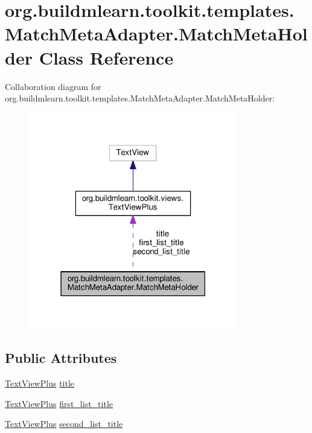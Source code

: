 \hypertarget{classorg_1_1buildmlearn_1_1toolkit_1_1templates_1_1MatchMetaAdapter_1_1MatchMetaHolder}{}\section{org.\+buildmlearn.\+toolkit.\+templates.\+Match\+Meta\+Adapter.\+Match\+Meta\+Holder Class Reference}
\label{classorg_1_1buildmlearn_1_1toolkit_1_1templates_1_1MatchMetaAdapter_1_1MatchMetaHolder}


Collaboration diagram for org.\+buildmlearn.\+toolkit.\+templates.\+Match\+Meta\+Adapter.\+Match\+Meta\+Holder\+:
\nopagebreak
\begin{figure}[H]
\begin{center}
\leavevmode
\includegraphics[width=259pt]{classorg_1_1buildmlearn_1_1toolkit_1_1templates_1_1MatchMetaAdapter_1_1MatchMetaHolder__coll__graph}
\end{center}
\end{figure}
\subsection*{Public Attributes}
\begin{DoxyCompactItemize}
\item 
\hyperlink{classorg_1_1buildmlearn_1_1toolkit_1_1views_1_1TextViewPlus}{Text\+View\+Plus} \hyperlink{classorg_1_1buildmlearn_1_1toolkit_1_1templates_1_1MatchMetaAdapter_1_1MatchMetaHolder_ac796e46f5bb18dd6f1dc765e56ae63f1}{title}
\item 
\hyperlink{classorg_1_1buildmlearn_1_1toolkit_1_1views_1_1TextViewPlus}{Text\+View\+Plus} \hyperlink{classorg_1_1buildmlearn_1_1toolkit_1_1templates_1_1MatchMetaAdapter_1_1MatchMetaHolder_af1bbb774b9afd21857071f608d267083}{first\+\_\+list\+\_\+title}
\item 
\hyperlink{classorg_1_1buildmlearn_1_1toolkit_1_1views_1_1TextViewPlus}{Text\+View\+Plus} \hyperlink{classorg_1_1buildmlearn_1_1toolkit_1_1templates_1_1MatchMetaAdapter_1_1MatchMetaHolder_a8a38748256555c75aec17f748a62f848}{second\+\_\+list\+\_\+title}
\end{DoxyCompactItemize}


